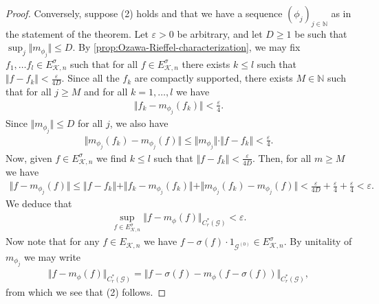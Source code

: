 \documentclass[11pt,a4paper,oneside,final,reqno]{amsart}
\theoremstyle{definition}
\newcommand{\G}{\mathcal{G}}
\newcommand{\Go}{\mathcal{G}^{(0)}}
\newcommand{\cK}{\mathcal{K}}
\newcommand{\Cred}{C_{r}^{*}}
\newcommand{\N}{\mathbb{N}}
\numberwithin{equation}{section}
\begin{document}
\begin{proof}
		
		Conversely, suppose (2) holds and that we have a sequence  $(\phi_j)_{j \in \N}$ as in the statement of the theorem.
		Let $\varepsilon > 0$ be arbitrary, and let $D \geq 1$ be such that  
		$\sup_j \Vert m_{\phi_j} \Vert \leq D$.
		By \cref{prop:Ozawa-Rieffel-characterization}, we may fix 
		$f_1, \ldots f_l \in E^\sigma_{\cK, n}$
		such that for all 
		$f \in E^\sigma_{\cK, n}$ 
		there exists $k \leq l$ such that $\Vert f - f_k \Vert < \frac{\varepsilon}{4D}$. Since all the $f_k$ are compactly supported, there exists $M \in \N$ such that for all $j \geq M$ and for all $k =1, \ldots ,l$ we have
		\begin{align*}
			\Vert f_k - m_{\phi_j}(f_k) \Vert < \frac{\varepsilon}{4}. 
		\end{align*}
		Since $ \Vert m_{\phi_j} \Vert \leq D$ for all $j$, we also have
		\begin{align*}
			\Vert m_{\phi_j} (f_k) - m_{\phi_j}(f) \Vert \leq \Vert m_{\phi_j} \Vert \cdot \Vert f- f_k \Vert < \frac{\varepsilon}{4}.
		\end{align*}
		Now, given 
		$f \in E^\sigma_{\cK, n}$ 
		we find $k\leq l$ such that $\Vert f - f_k \Vert < \frac{\varepsilon}{4D}$. Then, for all $m \geq M$ we have
		\begin{align*}
			\Vert f - m_{\phi_j}(f) \Vert \leq \Vert f - f_k \Vert + \Vert f_k - m_{\phi_j}(f_k) \Vert + \Vert m_{\phi_j}(f_k) - m_{\phi_j}(f) \Vert < \frac{\varepsilon}{4D} + \frac{\varepsilon}{4} + \frac{\varepsilon}{4} < \varepsilon.
		\end{align*}
		We deduce 
		that
		\begin{align*}
			\sup_{f\in E^\sigma_{\cK, n}} \Vert f - m_{\phi}(f) \Vert_{\Cred(\G)} < \varepsilon.
		\end{align*}
		Now note that for any $ f \in E_{\cK, n}$ we have  $f - \sigma(f)\cdot 1_{\Go} \in E^\sigma_{\cK , n}$.
		By unitality of $m_{\phi_j}$ we may write 
		\begin{align*}
			\Vert f - m_\phi(f) \Vert_{\Cred(\G)} = \Vert f - \sigma(f) - m_\phi(f- \sigma(f)) \Vert_{\Cred(\G)} ,
		\end{align*}
		from which we see that (2)  follows. 
	\end{proof}

	
\end{document}
